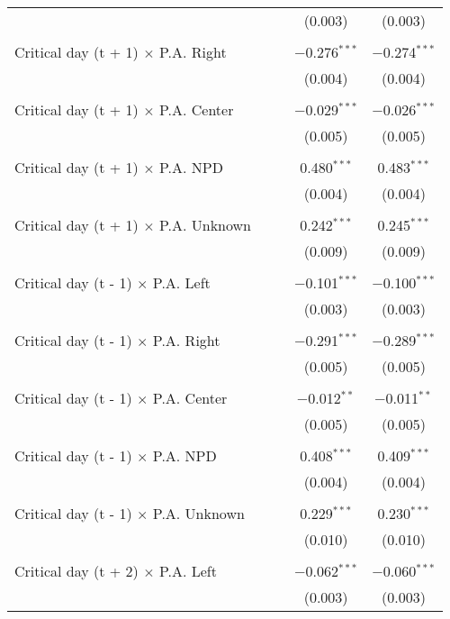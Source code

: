 \documentclass[
]{article}
\begin{document}
\begin{table}[!htbp]
{\begin{tabular}{@{\extracolsep{5pt}}lcccc}
  &  &  & (0.003) & (0.003) \\ 
  & & & & \\ 
 Critical day (t + 1) $\times$ P.A. Right &  &  & $-$0.276$^{***}$ & $-$0.274$^{***}$ \\ 
  &  &  & (0.004) & (0.004) \\ 
  & & & & \\ 
 Critical day (t + 1) $\times$ P.A. Center &  &  & $-$0.029$^{***}$ & $-$0.026$^{***}$ \\ 
  &  &  & (0.005) & (0.005) \\ 
  & & & & \\ 
 Critical day (t + 1) $\times$ P.A. NPD &  &  & 0.480$^{***}$ & 0.483$^{***}$ \\ 
  &  &  & (0.004) & (0.004) \\ 
  & & & & \\ 
 Critical day (t + 1) $\times$ P.A. Unknown &  &  & 0.242$^{***}$ & 0.245$^{***}$ \\ 
  &  &  & (0.009) & (0.009) \\ 
  & & & & \\ 
 Critical day (t - 1) $\times$ P.A. Left &  &  & $-$0.101$^{***}$ & $-$0.100$^{***}$ \\ 
  &  &  & (0.003) & (0.003) \\ 
  & & & & \\ 
 Critical day (t - 1) $\times$ P.A. Right &  &  & $-$0.291$^{***}$ & $-$0.289$^{***}$ \\ 
  &  &  & (0.005) & (0.005) \\ 
  & & & & \\ 
 Critical day (t - 1) $\times$ P.A. Center &  &  & $-$0.012$^{**}$ & $-$0.011$^{**}$ \\ 
  &  &  & (0.005) & (0.005) \\ 
  & & & & \\ 
 Critical day (t - 1) $\times$ P.A. NPD &  &  & 0.408$^{***}$ & 0.409$^{***}$ \\ 
  &  &  & (0.004) & (0.004) \\ 
  & & & & \\ 
 Critical day (t - 1) $\times$ P.A. Unknown &  &  & 0.229$^{***}$ & 0.230$^{***}$ \\ 
  &  &  & (0.010) & (0.010) \\ 
  & & & & \\ 
 Critical day (t + 2) $\times$ P.A. Left &  &  & $-$0.062$^{***}$ & $-$0.060$^{***}$ \\ 
  &  &  & (0.003) & (0.003) \\ 

\end{tabular}}
\end{table}
\end{document}
